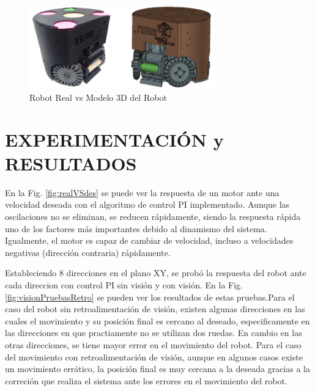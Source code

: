 \documentclass[twocolumn,10pt]{amrob}
\begin{document}
\begin{figure}
  \centering
    \includegraphics[width=8cm]{realVS3D.png}
  \caption{Robot Real vs Modelo 3D del Robot}
  \label{fig:ModRealVSdes}
\end{figure}
\section*{EXPERIMENTACIÓN y RESULTADOS}

En la Fig. \ref{fig:realVSdes} se puede ver la respuesta de un motor ante una velocidad deseada con el algoritmo de control PI implementado. Aunque las oscilaciones no se eliminan, se reducen rápidamente, siendo la respuesta rápida uno de los factores más importantes debido al dinamismo del sistema. Igualmente, el motor es capaz de cambiar de velocidad, incluso a velocidades negativas (dirección contraria) rápidamente. \par
Estableciendo 8 direcciones en el plano XY, se probó la respuesta del robot ante cada direccion con control PI sin visión y con visión. En la Fig. \ref{fig:visionPruebasRetro} se pueden ver los resultados de estas pruebas.Para el caso del robot sin retroalimentación de visión, existen algunas direcciones en las cuales el movimiento y su posición final es cercano al deseado, especificamente en las direcciones en que practiamente no se utilizan dos ruedas. En cambio en las otras direcciones, se tiene mayor error en el movimiento del robot. Para el caso del movimiento con retroalimentación de visión, aunque en algunos casos existe un movimiento errático, la posición final es muy cercana a la deseada gracias a la correción que realiza el sistema ante los errores en el movimiento del robot. \par
\end{document}
